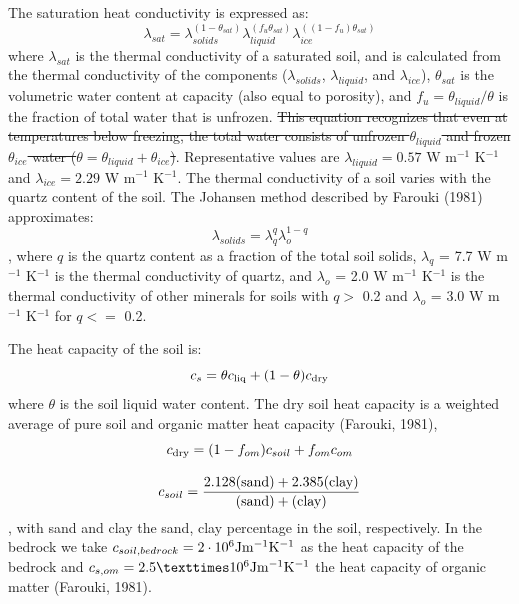 \documentclass{article}
\begin{document}
The saturation heat conductivity is expressed as:
\begin{equation}
\lambda_{sat} = \lambda_{solids}^{(1- \theta_{sat} )}  \lambda_{liquid}^{(f_u \theta_{sat} )}  \lambda_{ice}^{( (1-f_u) \theta_{sat} )} 
\end{equation}
where $\lambda_{sat}$ is the thermal conductivity of a saturated soil, and is calculated from the thermal conductivity of the components ($\lambda_{solids}$, $\lambda_{liquid}$, and $\lambda_{ice}$), $\theta_{sat}$ is the volumetric water content at capacity (also equal to porosity), and $f_u = \theta_{liquid} / \theta$ is the fraction of total water that is unfrozen. \st{This equation recognizes that even at temperatures below freezing, the total water consists of unfrozen $\theta_{liquid}$ and frozen $\theta_{ice}$ water ($\theta = \theta_{liquid} + \theta_{ice}$)}. Representative values are $\lambda_{liquid} = 0.57$ W m$^{-1}$ K$^{-1}$ and $\lambda_{ice} = 2.29$ W m$^{-1}$ K$^{-1}$. The thermal conductivity of a soil varies with the quartz content of the soil. The Johansen method described by Farouki (1981) approximates:
\begin{equation}
\lambda_{solids} = \lambda_{q}^q \lambda_{o}^{1-q}
\end{equation},
where $q$ is the quartz content as a fraction of the total soil solids, $\lambda_{q}$ = 7.7 W m$^{-1}$ K$^{-1}$ is the thermal conductivity of quartz, and $\lambda_{o}$ = 2.0 W m$^{-1}$ K$^{-1}$ is the thermal conductivity of other minerals for soils with $q >$ 0.2 and  $\lambda_{o}$ = 3.0 W m$^{-1}$ K$^{-1}$ for $q <=$ 0.2.

The heat capacity of the soil is:
\begin{equation}
c_s=\theta c_{\rm liq} + (1-\theta) c_{\rm dry}
\end{equation}
where  $\theta$ is the soil liquid water content. The dry soil heat capacity is a weighted average of pure soil and organic matter heat capacity (Farouki, 1981), 
\begin{equation}
c_{\rm dry} = (1-f_{om})c_{soil} + f_{om}c_{om}
\end{equation}

\begin{equation}
    c_{soil} = {\rm \frac{2.128 (sand)+ 2.385 (clay)}{(sand) + (clay)}}
\end{equation}, with sand and clay the sand, clay percentage in the soil, respectively.
In the bedrock we take $c_{soil,bedrock} = 2 \cdot 10^6 {\rm J m^{-1} K^{-1}}$ as the heat capacity of the bedrock and $c_{s,om} = 2.5 ×10^6 {\rm J m^{-1} K^{-1}}$ the heat capacity of organic matter (Farouki, 1981).
\end{document}
